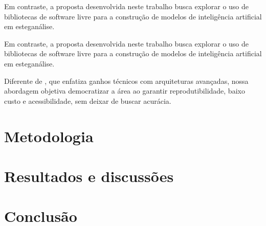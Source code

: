 \documentclass[12pt]{article}
\begin{document}
Em contraste, a proposta desenvolvida neste trabalho busca explorar o uso de
bibliotecas de software livre para a construção de modelos de inteligência
artificial em esteganálise.

Em contraste, a proposta desenvolvida neste trabalho busca explorar o uso de
bibliotecas de software livre para a construção de modelos de inteligência
artificial em esteganálise.

Diferente de \cite{chubachi2020cnn}, que enfatiza ganhos técnicos com
arquiteturas avançadas, nossa abordagem objetiva democratizar a área ao
garantir reprodutibilidade, baixo custo e acessibilidade, sem deixar de buscar
acurácia.

\section{Metodologia}

\section{Resultados e discussões}

\section{Conclusão}\label{sec:figs}






\end{document}
